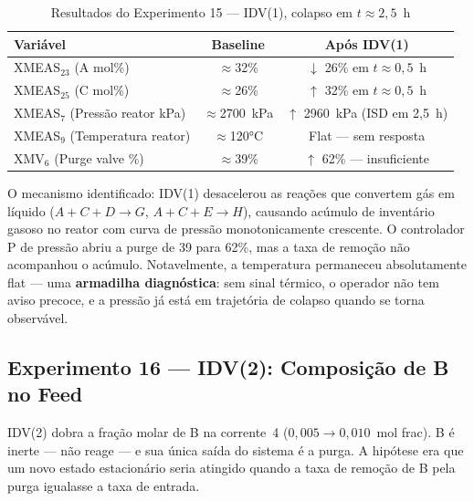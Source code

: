 \begin{table}[ht!]
\centering
\caption{Resultados do Experimento 15 — IDV(1), colapso em $t \approx 2{,}5$~h}
\label{tab:exp15}
\begin{tabular}{|l|c|c|}
\hline
\textbf{Variável}              & \textbf{Baseline}   & \textbf{Após IDV(1)}              \\
\hline
XMEAS$_{23}$ (A mol\%)         & $\approx$32\%       & $\downarrow$ 26\% em $t \approx 0{,}5$~h \\
XMEAS$_{25}$ (C mol\%)         & $\approx$26\%       & $\uparrow$ 32\% em $t \approx 0{,}5$~h  \\
XMEAS$_7$ (Pressão reator kPa) & $\approx$2700~kPa   & $\uparrow$ 2960~kPa (ISD em 2{,}5~h)     \\
XMEAS$_9$ (Temperatura reator) & $\approx$120°C      & Flat — sem resposta                      \\
XMV$_6$ (Purge valve \%)       & $\approx$39\%       & $\uparrow$ 62\% — insuficiente            \\
\hline
\end{tabular}
\end{table}

O mecanismo identificado: IDV(1) desacelerou as reações que convertem gás em líquido ($A + C + D \to G$, $A + C + E \to H$), causando acúmulo de inventário gasoso no reator com curva de pressão monotonicamente crescente. O controlador P de pressão abriu a purge de 39 para 62\%, mas a taxa de remoção não acompanhou o acúmulo. Notavelmente, a temperatura permaneceu absolutamente flat — uma \textbf{armadilha diagnóstica}: sem sinal térmico, o operador não tem aviso precoce, e a pressão já está em trajetória de colapso quando se torna observável.


\subsection{Experimento 16 — IDV(2): Composição de B no Feed}
\label{sec:exp16}

IDV(2) dobra a fração molar de B na corrente~4 ($0{,}005 \to 0{,}010$~mol frac). B é inerte — não reage — e sua única saída do sistema é a purga. A hipótese era que um novo estado estacionário seria atingido quando a taxa de remoção de B pela purga igualasse a taxa de entrada.


